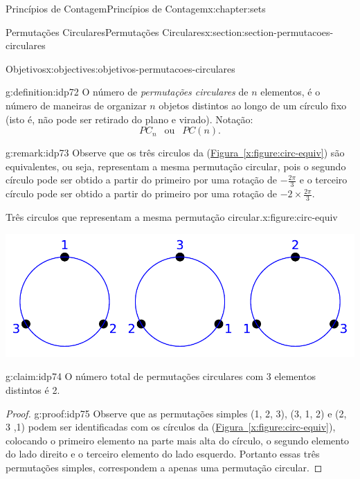 \documentclass[oneside,10pt,]{book}
\newcommand{\xreffont}{\relax}
\numberwithin{equation}{section}
\begin{document}
\begin{chapterptx}{Princípios de Contagem}{}{Princípios de Contagem}{}{}{x:chapter:sets}
\begin{sectionptx}{Permutações Circulares}{}{Permutações Circulares}{}{}{x:section:section-permutacoes-circulares}
\begin{objectives}{Objetivos}{x:objectives:objetivos-permutacoes-circulares}
\begin{enumerate}
\end{enumerate}
\end{objectives}
\begin{definition}{}{g:definition:idp72}%
O número de \emph{permutações circulares} de \(n\) elementos, é o número de maneiras de organizar \(n\) objetos distintos ao longo de um círculo fixo (isto é, não pode ser retirado do plano e virado). Notação:%
\begin{equation*}
PC_n ~~\text{ ou }~~ PC(n). 
\end{equation*}
%
\end{definition}
\begin{remark}{}{g:remark:idp73}%
Observe que os três circulos da  (\hyperref[x:figure:circ-equiv]{Figura~{\xreffont\ref{x:figure:circ-equiv}}}) são equivalentes, ou seja, representam a mesma permutação circular, pois o segundo círculo pode ser obtido a partir do primeiro por uma rotação de \(-\frac{2\pi}{3}\) e o terceiro círculo pode ser obtido a partir do primeiro por uma rotação de \(-2\times\frac{2\pi}{3}\).%
\begin{figureptx}{Três circulos que representam a mesma permutação circular.}{x:figure:circ-equiv}{}%
\begin{image}{0}{1}{0}%
\includegraphics[width=\linewidth]{images/circequiv}
\end{image}%
\tcblower
\end{figureptx}%
\end{remark}
\begin{claim}{}{}{g:claim:idp74}%
O número total de permutações circulares com 3 elementos distintos é 2.%
\end{claim}
\begin{proof}{}{g:proof:idp75}
Observe que as permutações simples (1, 2, 3), (3, 1, 2) e (2, 3 ,1) podem ser identificadas com os círculos da (\hyperref[x:figure:circ-equiv]{Figura~{\xreffont\ref{x:figure:circ-equiv}}}), colocando o primeiro elemento na parte mais alta do círculo, o segundo elemento do lado direito e o terceiro elemento do lado esquerdo. Portanto essas três permutações simples, correspondem a apenas uma permutação circular.%

\end{proof}
\end{sectionptx}
\end{chapterptx}
\end{document}

